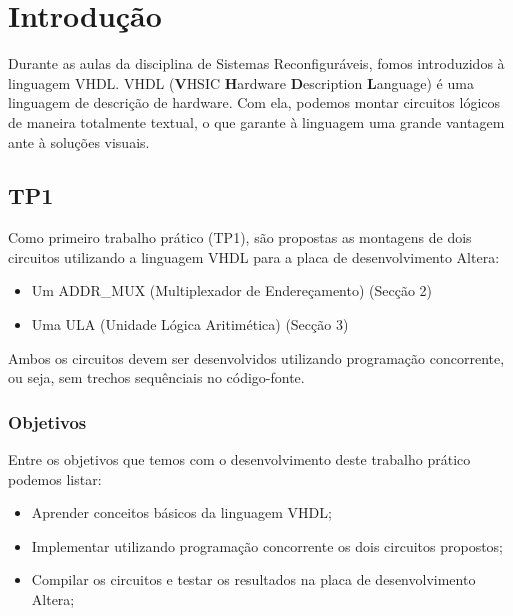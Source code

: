 \documentclass{article}
\begin{document}


\newpage
\thispagestyle{empty}
\tableofcontents

\newpage
\large %

\section{Introdução}

Durante as aulas da disciplina de Sistemas Reconfiguráveis, fomos introduzidos à linguagem VHDL. VHDL (\textbf{V}HSIC \textbf{H}ardware \textbf{D}escription \textbf{L}anguage) é uma linguagem de descrição de hardware. Com ela, podemos montar circuitos lógicos de maneira totalmente textual, o que garante à linguagem uma grande vantagem ante à soluções visuais.

\subsection{TP1}

Como primeiro trabalho prático (TP1), são propostas as montagens de dois circuitos utilizando a linguagem VHDL para a placa de desenvolvimento Altera:

\begin{itemize}
    \item Um ADDR\_MUX (Multiplexador de Endereçamento) (Secção 2)
    \item Uma ULA (Unidade Lógica Aritimética) (Secção 3)
\end{itemize}

Ambos os circuitos devem ser desenvolvidos utilizando programação concorrente, ou seja, sem trechos sequênciais no código-fonte.

\subsubsection{Objetivos}

Entre os objetivos que temos com o desenvolvimento deste trabalho prático podemos listar:

\begin{itemize}
    \item Aprender conceitos básicos da linguagem VHDL;
    \item Implementar utilizando programação concorrente os dois circuitos propostos;
    \item Compilar os circuitos e testar os resultados na placa de desenvolvimento Altera;
\end{itemize}
\end{document}
